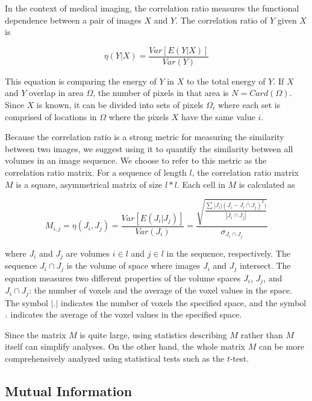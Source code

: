 In the context of medical imaging, the correlation ratio measures the functional dependence between a pair of images $X$ and $Y$. The correlation ratio of $Y$ given $X$ is

\begin{equation}
\eta(Y|X) = \frac{Var[E(Y|X)]}{Var(Y)}
\end{equation}

\noindent This equation is comparing the energy of $Y$ in $X$ to the total energy of $Y$. If $X$ and $Y$ overlap in area $\Omega$, the number of pixels in that area is $N = Card(\Omega)$. Since $X$ is known, it can be divided into sets of pixels $\Omega_i$ where each set is comprised of locations in $\Omega$ where the pixels $X$ have the same value $i$. 

Because the correlation ratio is a strong metric for measuring the similarity between two images, we suggest using it to quantify the similarity between all volumes in an image sequence. We choose to refer to this metric as the correlation ratio matrix. For a sequence of length $l$, the correlation ratio matrix $M$ is a square, asymmetrical matrix of size $l*l$. Each cell in $M$ is calculated as

\begin{equation}
M_{i,j} = \eta(J_i, J_j) = \frac{Var[E(J_i|J_j)]}{Var(J_i)} =  \frac{\sqrt{\frac{\sum |J_i|(\overline{J_i} - \overline{J_i \cap J_j})^2)}{|J_i \cap J_j|}}}{\sigma_{J_i \cap J_j}}
\end{equation}

\noindent where $J_i$ and $J_j$ are volumes $i \in l$ and $j \in l$ in the sequence, respectively. The sequence $J_i \cap J_j$ is the volume of space where images $J_i$ and $J_j$ intersect. The equation measures two different properties of the volume spaces $J_i$, $J_j$, and $J_i \cap J_j$: the number of voxels and the average of the voxel values in the space. The symbol $|.|$ indicates the number of voxels the specified space, and the symbol $\overline{.}$ indicates the average of the voxel values in the specified space. %

Since the matrix $M$ is quite large, using statistics describing $M$ rather than $M$ itself can simplify analyses. On the other hand, the whole matrix $M$ can be more comprehensively analyzed using statistical tests such as the $t$-test.

\subsection{Mutual Information}

